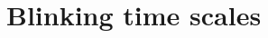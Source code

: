 \documentclass[11pt,a4paper,onecolumn]{article}
\newcommand*\commentauthor[1]{\textbf{{\textit{#1}}}}
\begin{document}

%
%


\section{Blinking time scales}

\end{document}
